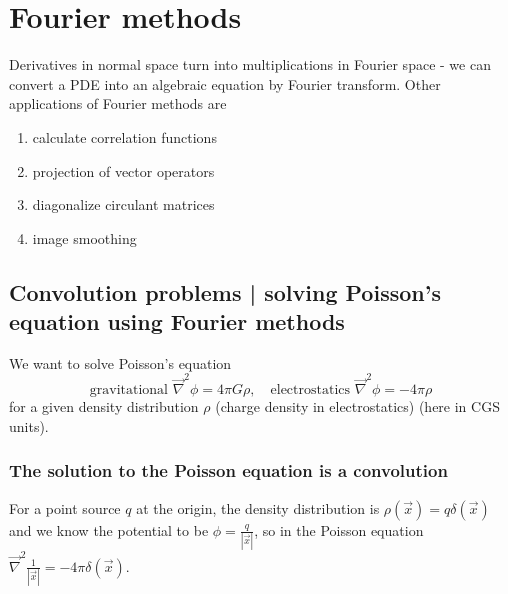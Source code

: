 \section{Fourier methods}
\thispagestyle{plain}

Derivatives in normal space turn into multiplications in Fourier space - we can convert
a PDE into an algebraic equation by Fourier transform. Other applications of Fourier
methods are

\begin{enumerate}
    \item calculate correlation functions
    \item projection of vector operators
    \item diagonalize circulant matrices
    \item image smoothing
\end{enumerate}

\subsection{Convolution problems | solving Poisson's equation using Fourier methods}
We want to solve Poisson's equation
\begin{equation}
    \text{gravitational } \vec{\nabla}^2 \phi = 4\pi G\rho, \quad \text{electrostatics } \vec{\nabla}^2 \phi = - 4 \pi \rho
\end{equation}
for a given density distribution $\rho$ (charge density in electrostatics) (here in CGS units).


\subsubsection{The solution to the Poisson equation is a convolution}
For a point source $q$ at the origin, the density distribution is $\rho(\vec{x}) = q \delta(\vec{x})$ and we know the
potential to be $\phi = \frac{q}{|\vec{x}|}$, so in the Poisson equation $\vec{\nabla}^2 \frac{1}{|\vec{x}|} = -4\pi \delta (\vec{x})$.

